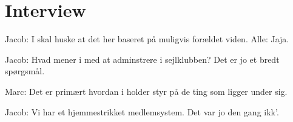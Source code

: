 \section{Interview}
Jacob: I skal huske at det her baseret på muligvis forældet viden.
Alle: Jaja.

Jacob: Hvad mener i med at adminstrere i sejlklubben? Det er jo et bredt spørgsmål.

Marc: Det er primært hvordan i holder styr på de ting som ligger under sig.

Jacob: Vi har et hjemmestrikket medlemsystem. Det var jo den gang ikk'. 